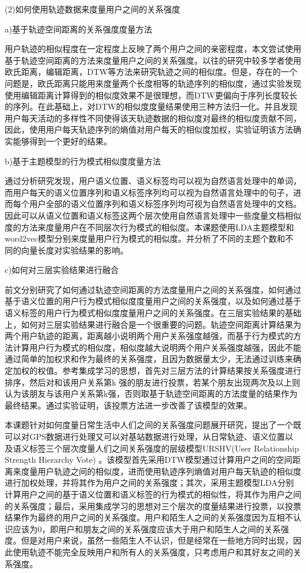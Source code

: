 \par (2)如何使用轨迹数据来度量用户之间的关系强度
\par a)基于轨迹空间距离的关系强度度量方法
\par 用户轨迹的相似程度在一定程度上反映了两个用户之间的亲密程度，本文尝试使用基于轨迹空间距离的方法来度量用户之间的关系强度。以往的研究中较多学者使用欧氏距离，编辑距离，DTW等方法来研究轨迹之间的相似度。但是，存在的一个问题是，欧氏距离只能用来度量两个长度相等的轨迹序列的相似度，通过实验发现使用编辑距离计算得到的相似度效果不是很理想，而DTW更偏向于序列长度较长的序列。在此基础上，对DTW的相似度度量结果使用三种方法归一化。并且发现用户每天活动的多样性不同使得该天轨迹数据的相似度对最终的相似度贡献不同，因此，使用用户每天轨迹序列的熵值对用户每天的相似度加权，实验证明该方法确实能够得到一个更好的结果。
\par b)基于主题模型的行为模式相似度度量方法
\par 通过分析研究发现，用户语义位置、语义标签均可以视为自然语言处理中的单词，而用户每天的语义位置序列和语义标签序列均可以视为自然语言处理中的句子，进而每个用户全部的语义位置序列和语义标签序列均可视为自然语言处理中的文档。因此可以从语义位置和语义标签这两个层次使用自然语言处理中一些度量文档相似度的方法来度量用户在不同层次行为模式的相似度。本课题使用LDA主题模型和word2vec模型分别来度量用户行为模式的相似度。并分析了不同的主题个数和不同的向量长度对实验结果的影响。
\par c)如何对三层实验结果进行融合
\par 前文分别研究了如何通过轨迹空间距离的方法度量用户之间的关系强度，如何通过基于语义位置的用户行为模式相似度度量用户之间的关系强度，以及如何通过基于语义标签的用户行为模式相似度度量用户之间的关系强度。在三层实验结果的基础上，如何对三层实验结果进行融合是一个很重要的问题。轨迹空间距离计算结果为两个用户轨迹的距离，距离越小说明两个用户关系强度越强，而基于行为模式的方法计算用户行为模式的相似度，相似度越大说明两个用户关系强度越强，因此不能通过简单的加权求和作为最终的关系强度，且因为数据量太少，无法通过训练来确定加权的权值。参考集成学习的思想，首先对三层方法的计算结果按关系强度进行排序，然后对和该用户关系第k 强的朋友进行投票，若某个朋友出现两次及以上则认为该朋友与该用户关系第k强，否则取基于轨迹空间距离的方法度量的结果作为最终结果。通过实验证明，该投票方法进一步改善了该模型的效果。
\par 本课题针对如何度量日常生活中人们之间的关系强度问题展开研究，提出了一个既可以对GPS数据进行处理又可以对基站数据进行处理，从日常轨迹、语义位置以及语义标签三个层次度量人们之间关系强度的层级模型URSHV(User Relationship Strength Hierarchy Vote) 。该模型首先采用DTW模型通过计算用户之间的空间距离来度量用户轨迹之间的相似度，进而使用轨迹序列熵值对用户每天轨迹的相似度进行加权处理，并将其作为用户之间的关系强度；其次，采用主题模型LDA分别计算用户之间的基于语义位置和语义标签的行为模式的相似性，将其作为用户之间的关系强度；最后，采用集成学习的思想对三个层次的度量结果进行投票，以投票结果作为最终的用户之间的关系强度。用户和陌生人之间的关系强度因为互相不认识应该为0，即用户和朋友之间的关系强度应该大于用户和陌生人之间的关系强度。但是对用户来说，虽然一些陌生人不认识，但是经常在一些地方同时出现，因此使用轨迹不能完全反映用户和所有人的关系强度，只考虑用户和其好友之间的关系强度。
